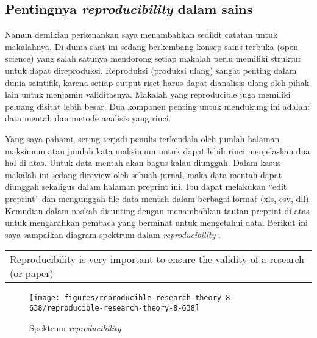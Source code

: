 \documentclass[10pt]{article}
\let\cite\citep
\renewenvironment{quote}
  {\begin{tabular}{|p{13cm}}}
  {\end{tabular}}
\providecommand\citep{\cite}
\begin{document}
\par\null

\subsection*{\texorpdfstring{Pentingnya \emph{reproducibility} dalam
sains}{Pentingnya reproducibility dalam sains}}

{\label{411520}}

Namun demikian perkenankan saya menambahkan sedikit catatan untuk
makalahnya. Di dunia saat ini sedang berkembang konsep sains terbuka
(open science) yang salah satunya mendorong setiap makalah perlu
memiliki struktur untuk dapat direproduksi. Reproduksi (produksi ulang)
sangat penting dalam dunia saintifik, karena setiap output riset harus
dapat dianalisis ulang oleh pihak lain untuk menjamin validitasnya.
Makalah yang reproducible juga memiliki peluang disitat lebih besar. Dua
komponen penting untuk mendukung ini adalah: data mentah dan metode
analisis yang rinci.

\par\null

Yang saya pahami, sering terjadi penulis terkendala oleh jumlah halaman
maksimum atau jumlah kata maksimum untuk dapat lebih rinci menjelaskan
dua hal di atas. Untuk data mentah akan bagus kalau diunggah. Dalam
kasus makalah ini sedang direview oleh sebuah jurnal, maka data mentah
dapat diunggah sekaligus dalam halaman preprint ini. Ibu dapat melakukan
``edit preprint'' dan mengunggah file data mentah dalam berbagai format
(xls, csv, dll). Kemudian dalam naskah disunting dengan menambahkan
tautan preprint di atas untuk mengarahkan pembaca yang berminat untuk
mengetahui data. Berikut ini saya sampaikan diagram spektrum dalam
\emph{reproducibility} \cite{theory}.~

\par\null

\begin{quote}
Reproducibility is very important to ensure the validity of a research
(or paper)
\end{quote}

\par\null\par\null{}
\begin{figure}[h!]
\begin{center}
\texttt{[image: figures/reproducible-research-theory-8-638/reproducible-research-theory-8-638]}
\caption{{Spektrum \emph{reproducibility}~\protect\cite{Peng_2011}
{\label{114879}}%
}}
\end{center}
\end{figure}
\end{document}
